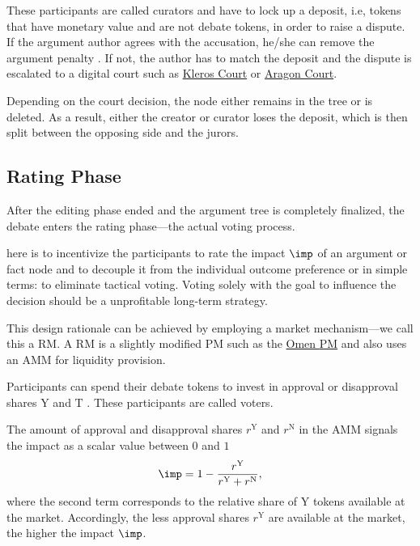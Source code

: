 \documentclass[%
aip,
amsmath,amssymb,
reprint,%
unsortedaddress,
nofootinbib
]{revtex4-2}
\newcommand{\T}{\text{T}}\newcommand{\debateTokens}{debate tokens}
\newcommand{\Y}{\text{Y}}
\newcommand{\N}{\text{N}}
\begin{document}
These participants are called curators and have to lock up a deposit, 
i.e, tokens that have monetary value and are not \debateTokens{}, 
in order to raise a dispute. 
If the argument author agrees with the accusation, he/she can remove the argument  penalty .
If not, the author has to match the deposit and the dispute is escalated to a digital court such as \href{https://kleros.io/}{Kleros Court}\cite{Lesaege2019,Lesaege2021} or \href{https://anj.aragon.org/}{Aragon Court}\cite{Cuende2019}.

Depending on the court decision, the node either remains in the tree or is deleted.
As a result, either the creator or curator loses the deposit, which is then split between the opposing side and the jurors. 


\subsection{Rating Phase}\label{sec:RatingPhase} %

After the editing phase ended and the argument tree is completely finalized,
the debate enters the rating phase---the actual voting process.

 here is to incentivize the participants to 
rate the impact $\imp$ of an argument or fact node
and to decouple it from the individual outcome preference or in simple terms: to eliminate tactical voting.
Voting solely with the goal to influence the decision should be a unprofitable long-term strategy.

This design rationale can be achieved by employing a market mechanism---we call this a \ac{RM}.
A \ac{RM} is a slightly modified \ac{PM} such as the \href{https://omen.eth.link/}{Omen \ac{PM}}\cite{Omen2020} and also uses an \ac{AMM}\cite{Zhang2018} for liquidity provision.

Participants can spend their \debateTokens{} to invest in approval or disapproval shares $\Y$ and $\T$
.
These participants are called voters.

The amount of approval and disapproval shares $r^\Y$ and $r^\N$ in the \ac{AMM}
signals the impact as a scalar value between $0$ and $1$
\begin{equation}
	\imp = 1-\frac{r^\Y}{r^\Y+r^\N},
\end{equation}
where the second term corresponds to the relative share of $\Y$ tokens available at the market.
Accordingly, the less approval shares $r^\Y$ are available at the market, the higher the impact $\imp$.
\end{document}

